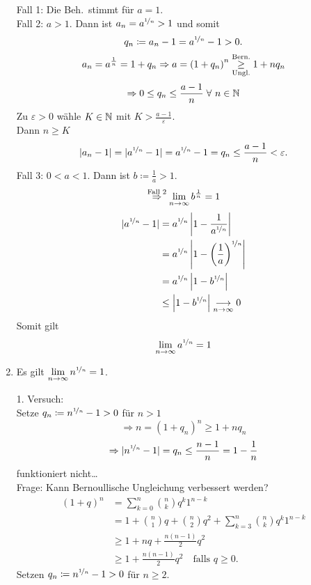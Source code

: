 \documentclass[../ana1.tex]{subfiles}
\begin{document}
\begin{bsp}
\begin{enumerate}
\begin{bew}
			Fall 1: Die Beh.\ stimmt für \( a=1 \).\\
			Fall 2: \(a>1\). Dann ist 
			\(a_n = a^{\nicefrac{1}{n}}>1\) 
			und somit 
			\[ q_n \coloneqq a_n-1 
			= a^{\nicefrac{1}{n}} -1 >0. \]
			\[a_n = a^{\frac{1}{n}} = 1+q_n \Rightarrow a = {(1+q_n)}^n \overset{\text{Bern.}}{\underset{\text{Ungl.}}{\geq}} 1+ nq_n\]
			\[\Rightarrow 0 \leq q_n \leq \frac{a-1}{n} \; \forall \, n\in\N \]
			Zu \(\varepsilon > 0\) wähle \(K\in\mathbb{N} \) mit \(K>\frac{a-1}{\varepsilon}\).\\
			Dann \(n\geq K\)
			\[|a_n-1| = |a^{\nicefrac{1}{n}}-1|= a^{\nicefrac{1}{n}} -1 = q_n \leq \frac{a-1}{n} < \varepsilon.\]
			Fall 3: \(0<a<1\). Dann ist \(b \coloneqq \frac{1}{a}>1\).
			\[\overset{\text{Fall 2}}{\Rightarrow} \lim\limits_{n\rightarrow\infty} b^{\frac{1}{n}} = 1\]
			\begin{align*}
				|a^{\nicefrac{1}{n}}-1|&=a^{\nicefrac{1}{n}}\left|1-\frac{1}{a^{\nicefrac{1}{n}}}\right|\\
				&= a^{\nicefrac{1}{n}}\left| 1 - {\left(\frac{1}{a}\right)}^{\nicefrac{1}{n}} \right|\\
				&= a^{\nicefrac{1}{n}} \left|1-b^{\nicefrac{1}{n}}\right|\\
				&\leq \left|1-b^{\nicefrac{1}{n}} \right|\underset{n\rightarrow\infty}{\longrightarrow} 0
			\end{align*}
			Somit gilt
			\[\lim\limits_{n\rightarrow\infty} a^{\nicefrac{1}{n}} = 1\]
		\end{bew}
	\item Es gilt \(\lim\limits_{n\rightarrow\infty}n^{\nicefrac{1}{n}}=1\).
	\begin{bew}
		1. Versuch:\\
		Setze \(q_n \coloneqq n^{\nicefrac{1}{n}} -1>0\) für \(n>1\) \\
		\[\Rightarrow n={(1+q_n)}^n \geq 1+nq_n\]
		\[\Rightarrow |n^{\nicefrac{1}{n}}-1| = q_n \leq \frac{n-1}{n} = 1-\frac{1}{n}\]
		funktioniert nicht\dots \\
		Frage: Kann Bernoullische Ungleichung verbessert werden?\\
		\begin{align*}
			{(1+q)}^n &= \sum_{k=0}^{n} \binom{n}{k} q^k1^{n-k}\\
			&=1+\binom{n}{1}q + \binom{n}{2}q^2 + \sum_{k=3}^{n}\binom{n}{k} q^k1^{n-k}\\
			&\geq 1+nq + \frac{n(n-1)}{2} q^2\\
			&\geq 1+\frac{n(n-1)}{2} q^2 \quad\text{falls }	q\geq 0. \tag{\(*\)}
		\end{align*}
		Setzen \(q_n \coloneqq n^{\nicefrac{1}{n}} -1 >0\) für \(n\geq 2\).

\end{bew}
\end{enumerate}
\end{bsp}
\end{document}

